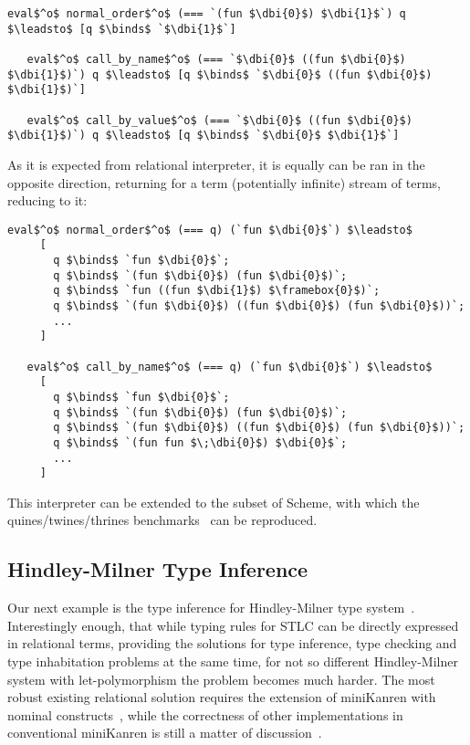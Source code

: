 \begin{lstlisting}[basicstyle=\small]
   eval$^o$ normal_order$^o$ (=== `(fun $\dbi{0}$) $\dbi{1}$`) q $\leadsto$ [q $\binds$ `$\dbi{1}$`]
   
   eval$^o$ call_by_name$^o$ (=== `$\dbi{0}$ ((fun $\dbi{0}$) $\dbi{1}$)`) q $\leadsto$ [q $\binds$ `$\dbi{0}$ ((fun $\dbi{0}$) $\dbi{1}$)`]   

   eval$^o$ call_by_value$^o$ (=== `$\dbi{0}$ ((fun $\dbi{0}$) $\dbi{1}$)`) q $\leadsto$ [q $\binds$ `$\dbi{0}$ $\dbi{1}$`] 
\end{lstlisting}

As it is expected from relational interpreter, it is equally can be ran in the opposite direction, returning for a term (potentially infinite) stream
of terms, reducing to it:

\begin{lstlisting}[basicstyle=\small]
   eval$^o$ normal_order$^o$ (=== q) (`fun $\dbi{0}$`) $\leadsto$ 
     [
       q $\binds$ `fun $\dbi{0}$`; 
       q $\binds$ `(fun $\dbi{0}$) (fun $\dbi{0}$)`; 
       q $\binds$ `fun ((fun $\dbi{1}$) $\framebox{0}$)`; 
       q $\binds$ `(fun $\dbi{0}$) ((fun $\dbi{0}$) (fun $\dbi{0}$))`;  
       ...
     ] 

   eval$^o$ call_by_name$^o$ (=== q) (`fun $\dbi{0}$`) $\leadsto$ 
     [
       q $\binds$ `fun $\dbi{0}$`; 
       q $\binds$ `(fun $\dbi{0}$) (fun $\dbi{0}$)`; 
       q $\binds$ `(fun $\dbi{0}$) ((fun $\dbi{0}$) (fun $\dbi{0}$))`; 
       q $\binds$ `(fun fun $\;\dbi{0}$) $\dbi{0}$`; 
       ...
     ] 
\end{lstlisting}

This interpreter can be extended to the subset of Scheme, with which the quines/twines/thrines benchmarks~\cite{Untagged} can be
reproduced.

\subsection{Hindley-Milner Type Inference}

Our next example is the type inference for Hindley-Milner type system~\cite{Types}. Interestingly enough, that while typing rules for
STLC can be directly expressed in relational terms, providing the solutions for type inference, type checking and type inhabitation
problems at the same time, for not so different Hindley-Milner system with let-polymorphism the problem becomes much
harder. The most robust existing relational solution requires the extension of miniKanren with nominal constructs~\cite{alphaKanren}, while
the correctness of other implementations in conventional miniKanren is still a matter of discussion~\cite{WillOnHM}.

